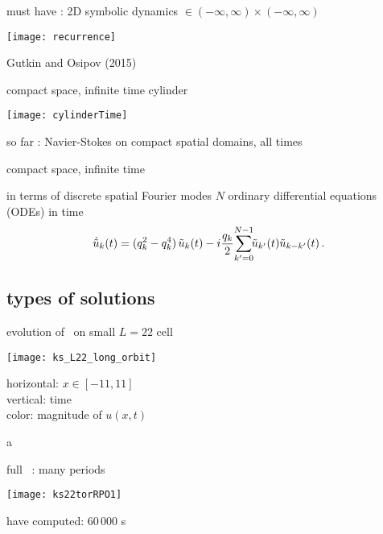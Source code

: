 \begin{frame}{
must have : 2D symbolic dynamics
$\in (-\infty, \infty)\times (-\infty, \infty)$
             }
\begin{center}
\texttt{[image: recurrence]}
\end{center}

\hfill Gutkin and Osipov (2015)
\end{frame}

\begin{frame}{compact space, infinite time cylinder}
\begin{center}
\texttt{[image: cylinderTime]}
\end{center}
so far : Navier-Stokes on compact spatial domains, all times
\end{frame}

\begin{frame}{compact space, infinite time \KS}

\begin{block}{in terms of discrete spatial Fourier modes}
$N$ ordinary differential equations (ODEs) in time
\[
\dot{\tilde{u}}_k(t) = ( q_k^2 - q_k^4 )\, \tilde{u}_k(t)
- i \frac{q_k}{2} \!\sum_{k'=0}^{N-1} \!\!\tilde{u}_{k'}(t) \tilde{u}_{k-k'}(t)
\,.
\]
\end{block}
\end{frame}


\subsection{types of solutions}
\begin{frame}{evolution of \KS\ on small $L=22$ cell}
\begin{center}
  \texttt{[image: ks\_L22\_long\_orbit]}
\end{center}
horizontal: $x \in [-11,11]$
\\
vertical: time
\\
color: magnitude of $u(x,t)$
\end{frame}

\begin{frame}{a \rpo}
\begin{block}{full \statesp\ : many periods}
\begin{center}
\texttt{[image: ks22torRPO1]}
\end{center}
\end{block}
have computed: 60\,000 \po s
\end{frame}

